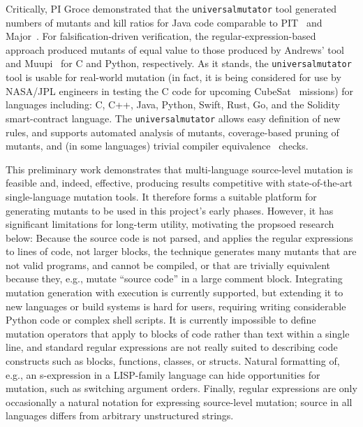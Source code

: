 Critically, PI Groce demonstrated that the {\tt universalmutator} tool generated
numbers of mutants and kill ratios for Java code comparable to
PIT~\cite{pittest} and Major~\cite{Major}.  For falsification-driven
verification, the regular-expression-based approach produced mutants of equal
value to those produced by Andrews' tool~\cite{mutant} and Muupi~\cite{muupi}
for C and Python, respectively.  As it stands, the {\tt universalmutator} tool
is usable for real-world mutation (in fact, it is being considered for use by
NASA/JPL engineers in testing the C code for upcoming CubeSat~\cite{CubeSat}
missions) for languages including: C, C++, Java, Python, Swift, Rust, Go, and
the Solidity smart-contract language.  The {\tt universalmutator} allows easy
definition of new rules, and supports automated analysis of mutants,
coverage-based pruning of mutants, and (in some languages) trivial compiler
equivalence~\cite{TCE} checks.

This preliminary work demonstrates that multi-language source-level mutation is
feasible and, indeed, effective, producing results competitive with
state-of-the-art single-language mutation tools.  It therefore forms a suitable
platform for generating mutants to be used in this project's early phases.  
However, it has significant limitations for long-term utility, motivating the
propsoed research below: Because the source
code is not parsed, and applies the regular expressions to lines of code, not
larger blocks, the technique generates many mutants that are not valid programs,
and cannot be compiled, or that are trivially equivalent because they, e.g.,
mutate ``source code'' in a large comment block.  Integrating mutation
generation with execution is currently supported, but extending it to new
languages or build systems is hard for users, requiring writing considerable
Python code or complex shell scripts.  It is currently impossible to define
mutation operators that apply to blocks of code rather than text within a single
line, and standard regular expressions are not really suited to describing code
constructs such as blocks, functions, classes, or structs.  Natural formatting
of, e.g., an s-expression in a LISP-family language can hide opportunities for
mutation, such as switching argument orders.  Finally, regular expressions are
only occasionally a natural notation for expressing source-level mutation;
source in all languages differs from arbitrary unstructured strings.


